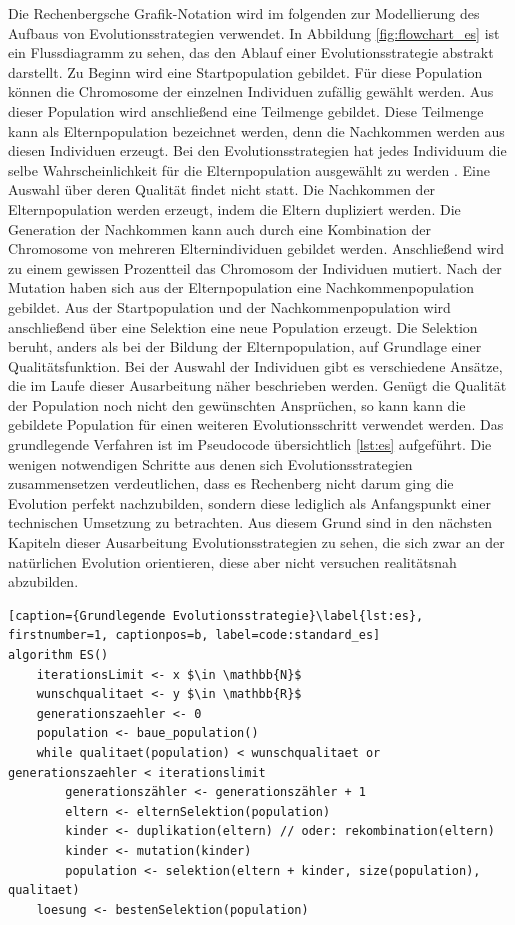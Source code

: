Die Rechenbergsche Grafik-Notation wird im folgenden zur Modellierung des Aufbaus von Evolutionsstrategien verwendet. In Abbildung \ref{fig:flowchart_es} ist ein Flussdiagramm zu sehen, das den Ablauf einer Evolutionsstrategie abstrakt darstellt.
Zu Beginn wird eine Startpopulation gebildet. Für diese Population können die Chromosome der einzelnen Individuen zufällig gewählt werden. Aus dieser Population wird anschließend eine Teilmenge gebildet. Diese Teilmenge kann als Elternpopulation bezeichnet werden, denn die Nachkommen werden aus diesen Individuen erzeugt. Bei den Evolutionsstrategien hat jedes Individuum die selbe Wahrscheinlichkeit für die Elternpopulation ausgewählt zu werden \cite[S.220]{schoeneburg}. Eine Auswahl über deren Qualität findet nicht statt. Die Nachkommen der Elternpopulation werden erzeugt, indem die Eltern dupliziert werden. Die Generation der Nachkommen kann auch durch eine Kombination der Chromosome von mehreren Elternindividuen gebildet werden. Anschließend wird zu einem gewissen Prozentteil das Chromosom der Individuen mutiert. 
Nach der Mutation haben sich aus der Elternpopulation eine Nachkommenpopulation gebildet. Aus der Startpopulation und der Nachkommenpopulation wird anschließend über eine Selektion eine neue Population erzeugt. Die Selektion beruht, anders als bei der Bildung der Elternpopulation, auf Grundlage einer Qualitätsfunktion.
Bei der Auswahl der Individuen gibt es verschiedene Ansätze, die im Laufe dieser Ausarbeitung näher beschrieben werden. Genügt die Qualität der Population noch nicht den gewünschten Ansprüchen, so kann kann die gebildete Population für einen weiteren Evolutionsschritt verwendet werden.
Das grundlegende Verfahren ist im Pseudocode übersichtlich \ref{lst:es} aufgeführt. Die wenigen notwendigen Schritte aus denen sich Evolutionsstrategien zusammensetzen verdeutlichen, dass es Rechenberg nicht darum ging die Evolution perfekt nachzubilden, sondern diese lediglich als Anfangspunkt einer technischen Umsetzung zu betrachten. Aus diesem Grund sind in den nächsten Kapiteln dieser Ausarbeitung Evolutionsstrategien zu sehen, die sich zwar an der natürlichen Evolution orientieren, diese aber nicht versuchen realitätsnah abzubilden.
\begin{lstlisting}[caption={Grundlegende Evolutionsstrategie}\label{lst:es}, firstnumber=1, captionpos=b, label=code:standard_es]
algorithm ES()
	iterationsLimit <- x $\in \mathbb{N}$
	wunschqualitaet <- y $\in \mathbb{R}$
	generationszaehler <- 0
	population <- baue_population()
	while qualitaet(population) < wunschqualitaet or generationszaehler < iterationslimit
		generationszähler <- generationszähler + 1
		eltern <- elternSelektion(population)
		kinder <- duplikation(eltern) // oder: rekombination(eltern)
		kinder <- mutation(kinder)
		population <- selektion(eltern + kinder, size(population), qualitaet)
	loesung <- bestenSelektion(population)
\end{lstlisting}

